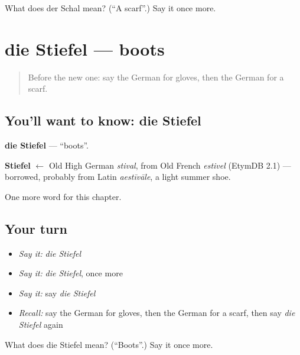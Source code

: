 \begin{tcolorbox}[breakable,colback=teal!4,colframe=teal!35!black,title={Before you move on}]
What does der Schal mean? (\textquotedblleft{}A scarf\textquotedblright{}.) Say it once more.
\end{tcolorbox}
\section[die Stiefel]{die Stiefel — boots}

\label{lesson:GE-C119-stiefel}



\begin{quote}
Before the new one: say the German for gloves, then the German for a scarf.
\end{quote}

\subsection*{You'll want to know: die Stiefel}
\textbf{die Stiefel} — \textquotedblleft{}boots\textquotedblright{}.

\begin{cousinweb}
\textbf{Stiefel} $\leftarrow$ Old High German \emph{stival}, from Old French \emph{estivel} (EtymDB 2.1) — borrowed, probably from Latin \emph{aestīvāle}, a light summer shoe.
\end{cousinweb}

\begin{grammarlens}[title={What you've built}]
One more word for this chapter.
\end{grammarlens}

\subsection*{Your turn}
\begin{itemize}
\raggedright
  \item \emph{Say it:} \emph{die Stiefel}
  \item \emph{Say it:} \emph{die Stiefel}, once more
  \item \emph{Say it:} say \emph{die Stiefel}
  \item \emph{Recall:} say the German for gloves, then the German for a scarf, then say \emph{die Stiefel} again
\end{itemize}

\begin{tcolorbox}[breakable,colback=teal!4,colframe=teal!35!black,title={Before you move on}]
What does die Stiefel mean? (\textquotedblleft{}Boots\textquotedblright{}.) Say it once more.
\end{tcolorbox}
